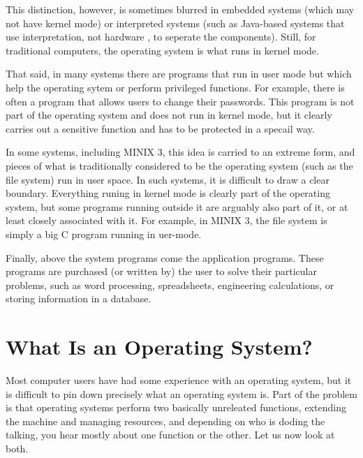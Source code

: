\documentclass{book}
\begin{document}
This distinction, however, is sometimes blurred in embedded systems (which may not have kernel mode) 
or interpreted systems (such as Java-based systems that use interpretation, not hardware , to seperate the components).
Still, for traditional computers, the operating system is what runs in kernel mode.

That said, in many systems there are programs that run in user mode but which help the operating sytem or perform privileged functions.
For example, there is often a program that allows users to change their passwords.
This program is not part of the operating system and does not run in kernel mode, but it clearly carries out a sensitive function 
and has to be protected in a specail way.

In some systems, including MINIX 3, this idea is carried to an extreme form, 
and pieces of what is traditionally considered to be the operating system (such as the file system) run in user space.
In such systems, it is difficult to draw a clear boundary.
Everything runing in kernel mode is clearly part of the operating system, 
but some programs running outside it are arguably also part of it, or at least closely associated with it.
For example, in MINIX 3, the file system is simply a big C program running in uer-mode.

Finally, above the system programs come the application programs.
These programs are purchased (or written by) the user to solve their particular problems, 
such as word processing, spreadsheets, engineering calculations, or storing information in a database.

\section{What Is an Operating System?}
Most computer users have had some experience with an operating system, but it is difficult to pin down precisely what an operating system is.
Part of the problem is that operating systems perform two basically unreleated functions, extending the machine and managing resources, 
and depending on who is doding the talking, you hear mostly about one function or the other.
Let us now look at both.
\end{document}
